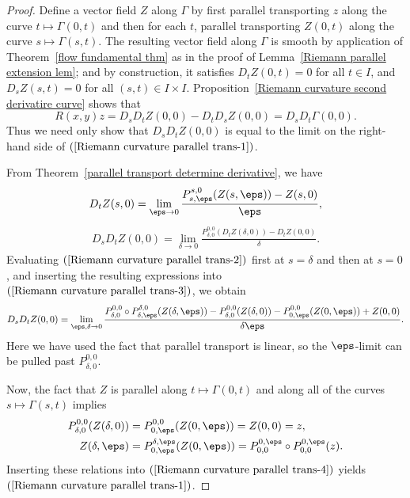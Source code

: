 \begin{proof}
Define a vector field $Z$ along $\Gamma$ by first parallel transporting $z$ along the curve $t\mapsto\Gamma(0,t)$ and then for each $t$, parallel transporting $Z(0,t)$ along the curve $s\mapsto\Gamma(s,t)$. The resulting vector field along $\Gamma$ is smooth by application of Theorem~\ref{flow fundamental thm} as in the proof of Lemma~\ref{Riemann parallel extension lem}; and by construction, it satisfies $D_tZ(0,t)=0$ for all $t\in I$, and $D_sZ(s,t)=0$ for all $(s,t)\in I\times I$. Proposition~\ref{Riemann curvature second derivatire curve} shows that
\[R(x,y)z=D_sD_tZ(0,0)-D_tD_sZ(0,0)=D_sD_t\Gamma(0,0).\]
Thus we need only show that $D_sD_tZ(0,0)$ is equal to the limit on the right-hand side of $(\ref{Riemann curvature parallel trans-1})$.\par
From Theorem~\ref{parallel transport determine derivative}, we have
\begin{align}\label{Riemann curvature parallel trans-2}
D_tZ(s,0)=\lim_{\eps\to 0}\frac{P_{s,\eps}^{s,0}(Z(s,\eps))-Z(s,0)}{\eps},
\end{align}
\begin{align}\label{Riemann curvature parallel trans-3}
D_sD_tZ(0,0)=\lim_{\delta\to 0}\frac{P_{\delta,0}^{0,0}(D_tZ(\delta,0))-D_tZ(0,0)}{\delta}.
\end{align}
Evaluating $(\ref{Riemann curvature parallel trans-2})$ first at $s=\delta$ and then at $s=0$, and inserting the resulting expressions into $(\ref{Riemann curvature parallel trans-3})$, 
we obtain
\begin{align}\label{Riemann curvature parallel trans-4}
D_sD_tZ(0,0)=\lim_{\eps,\delta\to 0}\frac{P_{\delta,0}^{0,0}\circ P_{\delta,\eps}^{\delta,0}(Z(\delta,\eps))-P_{\delta,0}^{0,0}(Z(\delta,0))-P_{0,\eps}^{0,0}(Z(0,\eps))+Z(0,0)}{\delta\eps}.
\end{align}
Here we have used the fact that parallel transport is linear, so the $\eps$-limit can be pulled past $P_{\delta,0}^{0,0}$.\par
Now, the fact that $Z$ is parallel along $t\mapsto\Gamma(0,t)$ and along all of the curves $s\mapsto\Gamma(s,t)$ implies
\begin{align*}
P_{\delta,0}^{0,0}(Z(\delta,0))&=P_{0,\eps}^{0,0}(Z(0,\eps))=Z(0,0)=z,\\
Z(\delta,\eps)&=P_{0,\eps}^{\delta,\eps}(Z(0,\eps))=P_{0,0}^{0,\eps}\circ P_{0,0}^{0,\eps}(z).
\end{align*}
Inserting these relations into $(\ref{Riemann curvature parallel trans-4})$ yields $(\ref{Riemann curvature parallel trans-1})$.
\end{proof}
